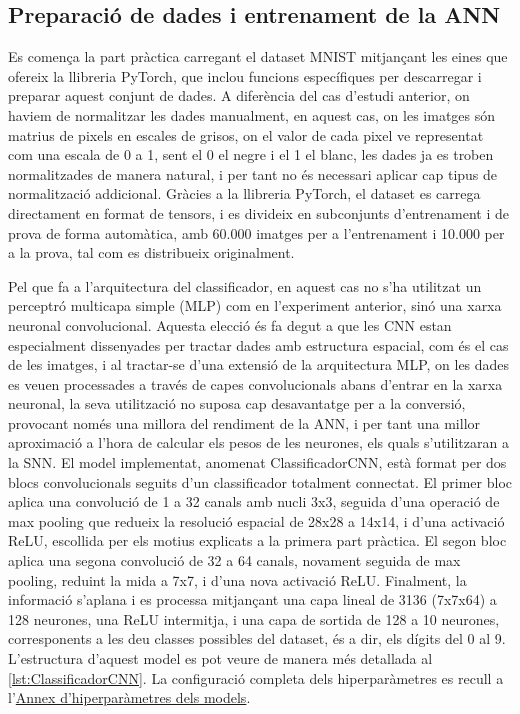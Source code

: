 \documentclass[a4paper,11pt, titlepage, twoside]{article}
\begin{document}
\subsection{Preparació de dades i entrenament de la ANN}
Es comença la part pràctica carregant el dataset MNIST mitjançant les eines que ofereix la llibreria PyTorch, que inclou funcions específiques per descarregar i preparar aquest conjunt de dades. A diferència del cas d'estudi anterior, on haviem de normalitzar les dades manualment, en aquest cas, on les imatges són matrius de pixels en escales de grisos, on el valor de cada pixel ve representat com una escala de 0 a 1, sent el 0 el negre i el 1 el blanc, les dades ja es troben normalitzades de manera natural, i per tant no és necessari aplicar cap tipus de normalització addicional. Gràcies a la llibreria PyTorch, el dataset es carrega directament en format de tensors, i es divideix en subconjunts d'entrenament i de prova de forma automàtica, amb 60.000 imatges per a l'entrenament i 10.000 per a la prova, tal com es distribueix originalment.

Pel que fa a l'arquitectura del classificador, en aquest cas no s'ha utilitzat un perceptró multicapa simple (MLP) com en l'experiment anterior, sinó una xarxa neuronal convolucional. Aquesta elecció és fa degut a que les CNN estan especialment dissenyades per tractar dades amb estructura espacial, com és el cas de les imatges, i al tractar-se d'una extensió de la arquitectura MLP, on les dades es veuen processades a través de capes convolucionals abans d'entrar en la xarxa neuronal, la seva utilització no suposa cap desavantatge per a la conversió, provocant només una millora del rendiment de la ANN, i per tant una millor aproximació a l'hora de calcular els pesos de les neurones, els quals s'utilitzaran a la SNN. El model implementat, anomenat ClassificadorCNN, està format per dos blocs convolucionals seguits d'un classificador totalment connectat. El primer bloc aplica una convolució de 1 a 32 canals amb nucli 3x3, seguida d'una operació de max pooling que redueix la resolució espacial de 28x28 a 14x14, i d'una activació ReLU, escollida per els motius explicats a la primera part pràctica. El segon bloc aplica una segona convolució de 32 a 64 canals, novament seguida de max pooling, reduint la mida a 7x7, i d'una nova activació ReLU. Finalment, la informació s'aplana i es processa mitjançant una capa lineal de 3136 (7x7x64) a 128 neurones, una ReLU intermitja, i una capa de sortida de 128 a 10 neurones, corresponents a les deu classes possibles del dataset, és a dir, els dígits del 0 al 9. L'estructura d'aquest model es pot veure de manera més detallada al \autoref{lst:ClassificadorCNN}. La configuració completa dels hiperparàmetres es recull a l'\hyperref[annex:hiperparametres]{Annex d'hiperparàmetres dels models}.
\end{document}
